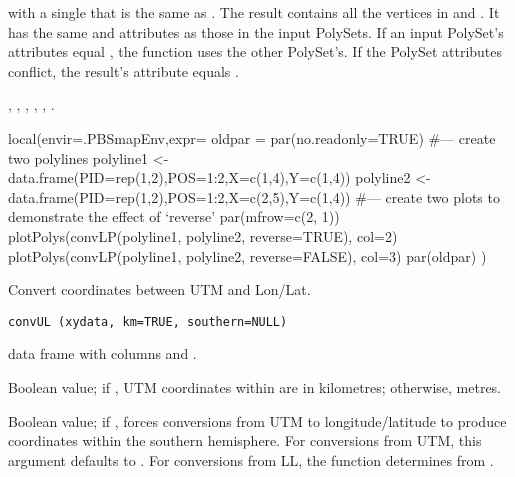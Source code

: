 \documentclass[letterpaper]{book}
\begin{document}
%
\begin{Value}
 with a single  that is the same as
. The result contains all the vertices in  and
. It has the same  and 
attributes as those in the input PolySets.  If an input PolySet's
attributes equal , the function uses the other
PolySet's. If the PolySet attributes conflict, the result's attribute
equals .
\end{Value}
%
\begin{SeeAlso}\relax
{},
,
,
,
,
.
\end{SeeAlso}
%
\begin{Examples}
\begin{ExampleCode}
local(envir=.PBSmapEnv,expr={
  oldpar = par(no.readonly=TRUE)
  #--- create two polylines
  polyline1 <- data.frame(PID=rep(1,2),POS=1:2,X=c(1,4),Y=c(1,4))
  polyline2 <- data.frame(PID=rep(1,2),POS=1:2,X=c(2,5),Y=c(1,4))
  #--- create two plots to demonstrate the effect of `reverse'
  par(mfrow=c(2, 1))
  plotPolys(convLP(polyline1, polyline2, reverse=TRUE), col=2)
  plotPolys(convLP(polyline1, polyline2, reverse=FALSE), col=3)
  par(oldpar)
})
\end{ExampleCode}
\end{Examples}
%
\begin{Description}\relax
Convert coordinates between UTM and Lon/Lat.
\end{Description}
%
\begin{Usage}
\begin{verbatim}
convUL (xydata, km=TRUE, southern=NULL)
\end{verbatim}
\end{Usage}
%
\begin{Arguments}
\begin{ldescription}
\item[\code{xydata}] data frame with columns  and .
\item[\code{km}] Boolean value; if , UTM coordinates within
 are in kilometres; otherwise, metres.
\item[\code{southern}] Boolean value; if , forces conversions from
UTM to longitude/latitude to produce coordinates within the
southern hemisphere.  For conversions from UTM, this argument defaults to
. For conversions from LL, the function determines 
 from .
\end{ldescription}
\end{Arguments}
\end{document}
